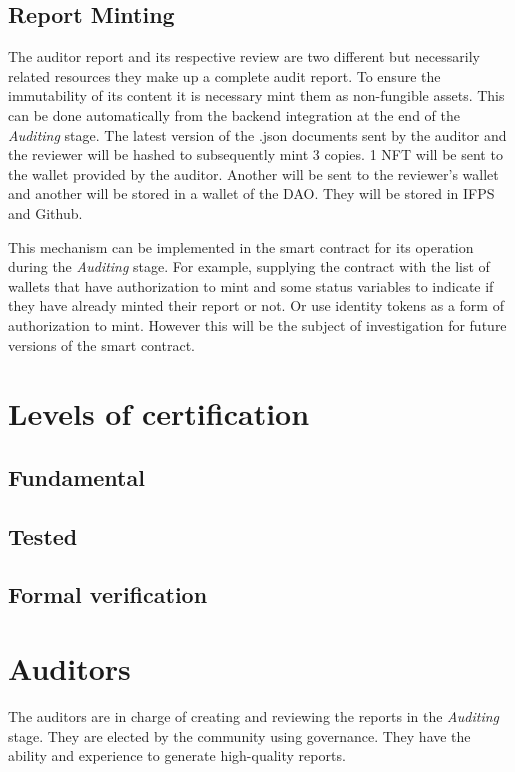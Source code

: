 \documentclass[12pt]{article}
\begin{document}
\subsection { Report Minting }

The auditor report and its respective review are two different but necessarily related resources they make up a complete audit report. To ensure the immutability of its content it is necessary mint them as non-fungible assets. This can be done automatically from the backend integration at the end of the \emph{Auditing} stage. 
The latest version of the .json documents sent by the auditor and the reviewer will be hashed to subsequently mint 3 copies. 1 NFT will be sent to the wallet provided by the auditor. Another will be sent to the reviewer's wallet and another will be stored in a wallet of the DAO. They will be stored in IFPS and Github.

This mechanism can be implemented in the smart contract for its operation during the \emph{Auditing} stage. For example, supplying the contract with the list of wallets that have authorization to mint and some status variables to indicate if they have already minted their report or not. Or use identity tokens as a form of authorization to mint. However this will be the subject of investigation for future versions of the smart contract.


\section{ Levels of certification }


\subsection { Fundamental }


\subsection { Tested }


\subsection { Formal verification }


\section{ Auditors }

The auditors are in charge of creating and reviewing the reports in the \emph{Auditing} stage. They are elected by the community using governance. They have the ability and experience to generate high-quality reports.
\end{document}
